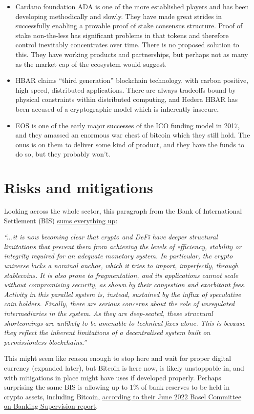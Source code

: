 \begin{itemize}
\item Cardano foundation ADA is one of the more established players and has been developing methodically and slowly. They have made great strides in successfully enabling a provable proof of stake consensus structure. Proof of stake non-the-less has significant problems in that tokens and therefore control inevitably concentrates over time. There is no proposed solution to this. They have working products and partnerships, but perhaps not as many as the market cap of the ecosystem would suggest. 
\item HBAR claims ``third generation'' blockchain technology, with carbon positive, high speed, distributed applications. There are always tradeoffs bound by physical constraints within distributed computing, and Hedera HBAR has been accused of a cryptographic model which is inherently insecure.
\item EOS is one of the early major successes of the ICO funding model in 2017, and they amassed an enormous war chest of bitcoin which they still hold. The onus is on them to deliver some kind of product, and they have the funds to do so, but they probably won't.
\end{itemize}
\section{Risks and mitigations}
Looking across the whole sector, this paragraph from the Bank of International Settlement (BIS) \href{https://www.bis.org/publ/arpdf/ar2022e3.htm}{sums everything up}: \par
\textit{``...it is now becoming clear that crypto and DeFi have deeper structural limitations that prevent them from achieving the levels of efficiency, stability or integrity required for an adequate monetary system. In particular, the crypto universe lacks a nominal anchor, which it tries to import, imperfectly, through stablecoins. It is also prone to fragmentation, and its applications cannot scale without compromising security, as shown by their congestion and exorbitant fees. Activity in this parallel system is, instead, sustained by the influx of speculative coin holders. Finally, there are serious concerns about the role of unregulated intermediaries in the system. As they are deep-seated, these structural shortcomings are unlikely to be amenable to technical fixes alone. This is because they reflect the inherent limitations of a decentralised system built on permissionless blockchains.''}\par
This might seem like reason enough to  stop here and wait for proper digital currency (expanded later), but Bitcoin is here now, is likely unstoppable in, and with mitigations in place might have uses if developed properly. Perhaps surprising the same BIS is allowing up to 1\% of bank reserves to be held in crypto assets, including Bitcoin, \href{https://www.bis.org/bcbs/publ/d533.pdf}{according to their June 2022 Basel Committee on Banking Supervision report}.
